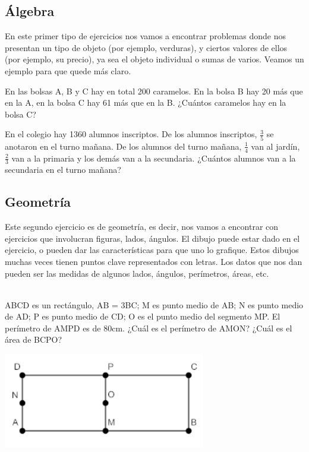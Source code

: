 \documentclass{article}
\begin{document}
\subsection{Álgebra}
\begin{normalsize}
En este primer tipo de ejercicios nos vamos a encontrar problemas donde nos presentan un tipo de objeto (por ejemplo, verduras), y ciertos valores de ellos (por ejemplo, su precio), ya sea el objeto individual o sumas de varios. Veamos un ejemplo para que quede más claro.
\\
\end{normalsize}

\begin{ejemplo}
En las bolsas A, B y C hay en total 200 caramelos. En la bolsa B hay 20 más que
en la A, en la bolsa C hay 61 más que en la B. ¿Cuántos caramelos hay en la bolsa C?
\end{ejemplo}

\begin{ejemplo}
En el colegio hay 1360 alumnos inscriptos. De los alumnos inscriptos, $\frac{3}{5}$ se anotaron en el turno mañana. De los alumnos del turno mañana, $\frac{1}{4}$ van al jardín, $\frac{2}{3}$ van a la primaria y los demás van a la secundaria. ¿Cuántos alumnos van a la secundaria en el turno mañana?
\end{ejemplo}

\subsection{Geometría}
\begin{normalsize}
Este segundo ejercicio es de geometría, es decir, nos vamos a encontrar con ejercicios que involucran figuras, lados, ángulos.
El dibujo puede estar dado en el ejercicio, o pueden dar las características para que uno lo grafique. Estos dibujos muchas veces tienen puntos clave representados con letras.
Los datos que nos dan pueden ser las medidas de algunos lados, ángulos, perímetros, áreas, etc.
\\ \\
\end{normalsize}

\begin{ejemplo}
ABCD es un rectángulo,
AB = 3BC;
M es punto medio de AB;
N es punto medio de AD;
P es punto medio de CD;
O es el punto medio del segmento MP.
El perímetro de AMPD es de 80cm.
¿Cuál es el perímetro de AMON?
¿Cuál es el área de BCPO?

\includegraphics[scale=0.6]{geometry-example-1}
\\
\\
\end{ejemplo}
\end{document}
